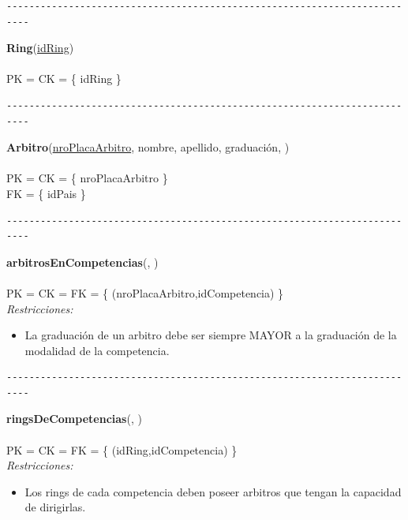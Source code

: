 \begin{verbatim}
--------------------------------------------------------------------------
\end{verbatim}

\noindent\textbf{Ring}(\uline{idRing})
\\
\\
PK = CK = \{ idRing \} \\

\begin{verbatim}
--------------------------------------------------------------------------
\end{verbatim}

\noindent\textbf{Arbitro}(\uline{nroPlacaArbitro}, nombre, apellido, graduación, )
\\
\\
PK = CK = \{ nroPlacaArbitro \} \\
FK = \{ idPais \} \\

\begin{verbatim}
--------------------------------------------------------------------------
\end{verbatim}

\noindent\textbf{arbitrosEnCompetencias}(, )
\\
\\
PK = CK = FK = \{ (nroPlacaArbitro,idCompetencia) \} \\

\textit{Restricciones:}
\begin{itemize}
	\item La graduación de un arbitro debe ser siempre MAYOR a la graduación de la modalidad de la competencia.
\end{itemize}

\begin{verbatim}
--------------------------------------------------------------------------
\end{verbatim}

\noindent\textbf{ringsDeCompetencias}(, )
\\
\\
PK = CK = FK = \{ (idRing,idCompetencia) \} \\

\textit{Restricciones:}
\begin{itemize}
	\item Los rings de cada competencia deben poseer arbitros que tengan la capacidad de dirigirlas.
\end{itemize}


